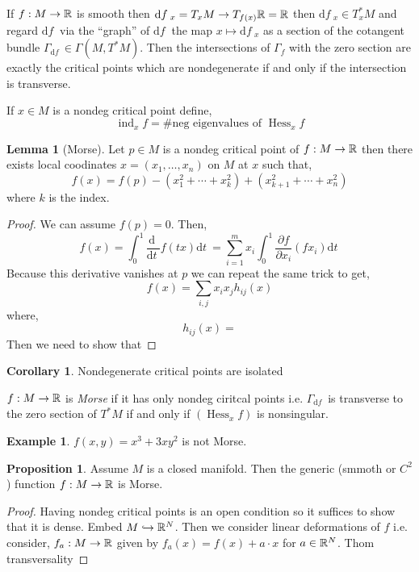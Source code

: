 \documentclass[12pt]{extarticle}
\renewcommand{\d}[1]{ \mathrm{d}#1 \:}
\newcommand{\deriv}[2]{\frac{\d{#1}}{\d{#2}}}
\newcommand{\pderiv}[2]{\frac{\partial{#1}}{\partial{#2}}}
\DeclareMathOperator{\Hess}{\mathrm{Hess}}
\DeclareMathOperator{\ind}{\mathrm{ind}}
\theoremstyle{definition}
\newtheorem{lemma}[theorem]{Lemma}
\newtheorem{proposition}[theorem]{Proposition}
\newtheorem{example}[theorem]{Example}
\newtheorem{corollary}[theorem]{Corollary}
\newenvironment{definition}[1][Definition:]{\begin{trivlist}
\item[\hskip \labelsep {\bfseries #1}]}{\end{trivlist}}
\newcommand{\embed}{\hookrightarrow}
\begin{document}
If $f : M \to \mathbb{R}$ is smooth then $\d{f}_x = T_x M \to T_{f(x)} \RR = \RR$ then $\d{f}_x \in T^*_x M$ and regard $\d{f}$ via the ``graph'' of $\d{f}$ the map $x \mapsto \d{f}_x$ as a section of the cotangent bundle $\Gamma_{\d{f}} \in \Gamma(M, T^* M)$. Then the intersections of $\Gamma_f$ with the zero section are exactly the critical points which are nondegenerate if and only if the intersection is transverse. 

\begin{definition}
If $x \in M$ is a nondeg critical point define,
\[ \ind_x f = \# \text{neg eigenvalues of } \Hess_x f \]
\end{definition}

\begin{lemma}[Morse]
Let $p \in M$ is a nondeg critical point of $f : M \to \mathbb{R}$ then there exists local coodinates $x = (x_1, \dots, x_n)$ on $M$ at $x$ such that,
\[ f(x) = f(p) - (x_1^2 + \cdots + x_k^2) + (x_{k+1}^2 + \cdots + x_n^2) \]
where $k$ is the index.  
\end{lemma}

\begin{proof}
We can assume $f(p) = 0$. Then,
\[ f(x) = \int_0^1 \deriv{}{t} f(tx) \d{t} = \sum_{i = 1}^m x_i \int_0^1 \pderiv{f}{x_i} (fx_i) \d{t} \]
Because this derivative vanishes at $p$ we can repeat the same trick to get,
\[ f(x) = \sum_{i,j} x_i x_j h_{ij}(x) \]
where,
\[ h_{ij}(x) =  \]
Then we need to show that 
\end{proof}


\begin{corollary}
Nondegenerate critical points are isolated 
\end{corollary}

\begin{definition}
$f : M \to \mathbb{R}$ is \textit{Morse} if it has only nondeg ciritcal points i.e. $\Gamma_{\d{f}}$ is transverse to the zero section of $T^* M$ if and only if $(\Hess_x f)$ is nonsingular.
\end{definition}

\begin{example}
$f(x,y) = x^3 + 3 x y^2$ is not Morse. 
\end{example}

\begin{proposition}
Assume $M$ is a closed manifold. Then the generic (smmoth or $C^2$) function $f: M \to \mathbb{R}$ is Morse.
\end{proposition}

\begin{proof}
Having nondeg critical points is an open condition so it suffices to show that it is dense. Embed $M \embed \RR^N$. Then we consider linear deformations of $f$ i.e. consider, $f_a : M \to \mathbb{R}$ given by $f_a(x) = f(x) + a \cdot x$ for $a \in \mathbb{R}^N$. Thom transversality 
\end{proof}
\end{document}
